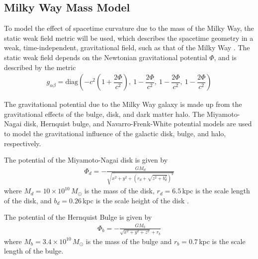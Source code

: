 \documentclass[review]{elsarticle}
\begin{document}
\subsection{Milky Way Mass Model}
To model the effect of spacetime curvature due to the mass of the Milky Way, the static weak field metric will be used, which describes the spacetime geometry in a weak, time-independent, gravitational field, such as that of the Milky Way \citep{Gasperini2013}. The static weak field depends on the Newtonian gravitational potential $\Phi$, and is described by the metric
\begin{gather}
g_{\alpha\beta}=\mathrm{diag}\left(-c^2\left(1+\dfrac{2\Phi}{c^2}\right),~1-\dfrac{2\Phi}{c^2},~1-\dfrac{2\Phi}{c^2},~1-\dfrac{2\Phi}{c^2}\right)
\end{gather}

The gravitational potential due to the Milky Way galaxy is made up from the gravitational effects of the bulge, disk, and dark matter halo. The Miyamoto-Nagai disk, Hernquist bulge, and Navarro-Frenk-White potential models are used to model the gravitational influence of the galactic disk, bulge, and halo, respectively.

The potential of the Miyamoto-Nagai disk \citep{Miyamoto1975} is given by
\begin{gather}
\Phi_d=-\frac{GM_d}{\sqrt{x^2+y^2+\left(r_d+\sqrt{z^2+b_d^2}\right)^2}}
\label{diskpot}
\end{gather}
where $M_d=10\times10^{10}\,M_\odot$ is the mass of the disk, $r_d=6.5$\,kpc is the scale length of the disk, and $b_d=0.26$\,kpc is the scale height of the disk \citep{Nusser2009}.

The potential of the Hernquist Bulge \citep{Hernquist1990} is given by
\begin{gather}
\Phi_b=-\frac{GM_b}{\sqrt{x^2+y^2+z^2}+r_b}
\label{bulgepot}
\end{gather}
where $M_b=3.4\times10^{10}\,M_\odot$ is the mass of the bulge and $r_b=0.7$\,kpc is the scale length of the bulge.
\end{document}
